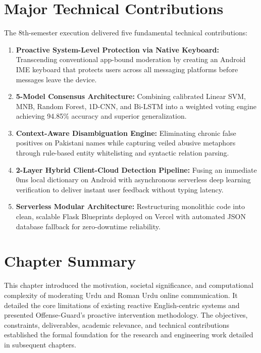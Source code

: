 \documentclass[A4paper,12pt]{report}
\theoremstyle{plain}
\theoremstyle{definition}
\theoremstyle{remark}
\numberwithin{equation}{section}
\begin{document}
\section{Major Technical Contributions}
The 8th-semester execution delivered five fundamental technical contributions:
\begin{enumerate}[leftmargin=*]
    \item \textbf{Proactive System-Level Protection via Native Keyboard:} Transcending conventional app-bound moderation by creating an Android IME keyboard that protects users across all messaging platforms before messages leave the device.
    \item \textbf{5-Model Consensus Architecture:} Combining calibrated Linear SVM, MNB, Random Forest, 1D-CNN, and Bi-LSTM into a weighted voting engine achieving 94.85\% accuracy and superior generalization.
    \item \textbf{Context-Aware Disambiguation Engine:} Eliminating chronic false positives on Pakistani names while capturing veiled abusive metaphors through rule-based entity whitelisting and syntactic relation parsing.
    \item \textbf{2-Layer Hybrid Client-Cloud Detection Pipeline:} Fusing an immediate 0ms local dictionary on Android with asynchronous serverless deep learning verification to deliver instant user feedback without typing latency.
    \item \textbf{Serverless Modular Architecture:} Restructuring monolithic code into clean, scalable Flask Blueprints deployed on Vercel with automated JSON database fallback for zero-downtime reliability.
\end{enumerate}

\section{Chapter Summary}
This chapter introduced the motivation, societal significance, and computational complexity of moderating Urdu and Roman Urdu online communication. It detailed the core limitations of existing reactive English-centric systems and presented Offense-Guard's proactive intervention methodology. The objectives, constraints, deliverables, academic relevance, and technical contributions established the formal foundation for the research and engineering work detailed in subsequent chapters.
\end{document}
